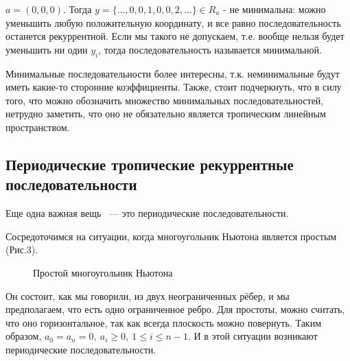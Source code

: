 \documentclass[russian]{lecture-notes}
\begin{document}
$a = (0,0,0)$. Тогда $y=\{\ldots , 0, 0, 1, 0, 0, 2,\ldots \}\in R_a$ - не минимальна:
можно уменьшить любую положительную координату, и все равно последовательность останется рекуррентной. Если мы такого не допускаем, т.е. вообще нельзя будет уменьшить ни один $y_i$, тогда последовательность называется минимальной.


Минимальные последовательности более интересны, т.к.
неминимальные будут иметь какие-то сторонние коэффициенты. Также, стоит подчеркнуть, что в силу того, что можно обозначить множество минимальных последовательностей, нетрудно заметить, что оно не обязательно является тропическим линейным пространством.


\subsection{Периодические тропические рекуррентные последовательности}

Еще одна важная вещь ~--- это периодические
последовательности.


Сосредоточимся на ситуации,
когда многоугольник Ньютона является простым (Рис.3).

\begin{figure}[h!]
\caption{Простой многоугольник Ньютона} 
\end{figure}

Он состоит, как мы говорили, из двух неограниченных рёбер, и мы предполагаем, что есть одно ограниченное ребро. Для простоты, можно считать, что оно горизонтальное, так как всегда плоскость можно повернуть. Таким образом, $a_0=a_n=0,\: a_i\geq 0,\: 1\leq i\leq n-1$. И в этой ситуации возникают периодические последовательности.
\end{document}
